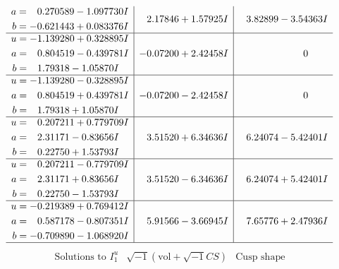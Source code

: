 \documentclass[1p]{elsarticle_modified}
\theoremstyle{definition}
\newcommand{\I}{\sqrt{-1}}
\begin{document}
$$\begin{array}{c|c|c}
\begin{aligned}
a &= \phantom{-}0.270589 - 1.097730 I \\
b &= -0.621443 + 0.083376 I\end{aligned}
 & \phantom{-}2.17846 + 1.57925 I & \phantom{-}3.82899 - 3.54363 I \\ \hline\begin{aligned}
u &= -1.139280 + 0.328895 I \\
a &= \phantom{-}0.804519 - 0.439781 I \\
b &= \phantom{-}1.79318 - 1.05870 I\end{aligned}
 & -0.07200 + 2.42458 I & \phantom{-0.000000 } 0 \\ \hline\begin{aligned}
u &= -1.139280 - 0.328895 I \\
a &= \phantom{-}0.804519 + 0.439781 I \\
b &= \phantom{-}1.79318 + 1.05870 I\end{aligned}
 & -0.07200 - 2.42458 I & \phantom{-0.000000 } 0 \\ \hline\begin{aligned}
u &= \phantom{-}0.207211 + 0.779709 I \\
a &= \phantom{-}2.31171 - 0.83656 I \\
b &= \phantom{-}0.22750 + 1.53793 I\end{aligned}
 & \phantom{-}3.51520 + 6.34636 I & \phantom{-}6.24074 - 5.42401 I \\ \hline\begin{aligned}
u &= \phantom{-}0.207211 - 0.779709 I \\
a &= \phantom{-}2.31171 + 0.83656 I \\
b &= \phantom{-}0.22750 - 1.53793 I\end{aligned}
 & \phantom{-}3.51520 - 6.34636 I & \phantom{-}6.24074 + 5.42401 I \\ \hline\begin{aligned}
u &= -0.219389 + 0.769412 I \\
a &= \phantom{-}0.587178 - 0.807351 I \\
b &= -0.709890 - 1.068920 I\end{aligned}
 & \phantom{-}5.91566 - 3.66945 I & \phantom{-}7.65776 + 2.47936 I\\
 \hline 
 \end{array}$$\newpage$$\begin{array}{c|c|c}  
\text{Solutions to }I^u_{1}& \I (\text{vol} + \sqrt{-1}CS) & \text{Cusp shape}\\
 \hline 
\begin{aligned}

\end{aligned}
\end{array}$$
\end{document}

